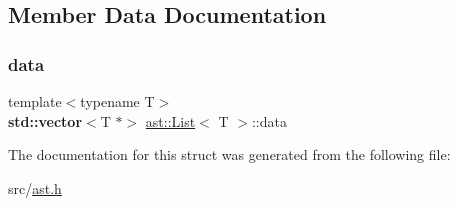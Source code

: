 \subsection{Member Data Documentation}
\mbox{\label{structast_1_1_list_a72e2d088761f7ab3d91c4597c49281f1}} 
\subsubsection{\texorpdfstring{data}{data}}
{\footnotesize\ttfamily template$<$typename T$>$ \\
\textbf{ std\+::vector}$<$T $\ast$$>$ \hyperlink{structast_1_1_list}{ast\+::\+List}$<$ T $>$\+::data}



The documentation for this struct was generated from the following file\+:\begin{DoxyCompactItemize}
\item 
src/\hyperlink{ast_8h}{ast.\+h}\end{DoxyCompactItemize}
